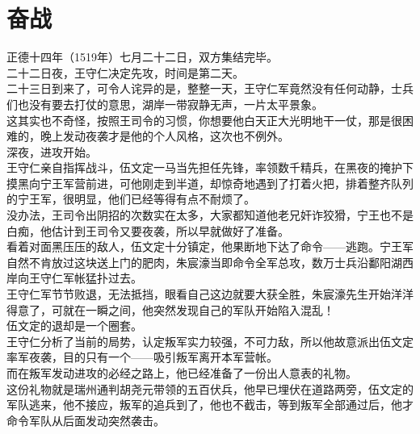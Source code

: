 \section{奋战}
\ifnum{}
	\begin{multicols}{\theparacolNo}
\fi
正德十四年（1519年）七月二十二日，双方集结完毕。\\

二十二日夜，王守仁决定先攻，时间是第二天。\\

二十三日到来了，可令人诧异的是，整整一天，王守仁军竟然没有任何动静，士兵们也没有要去打仗的意思，湖岸一带寂静无声，一片太平景象。\\

这其实也不奇怪，按照王司令的习惯，你想要他白天正大光明地干一仗，那是很困难的，晚上发动夜袭才是他的个人风格，这次也不例外。\\

深夜，进攻开始。\\

王守仁亲自指挥战斗，伍文定一马当先担任先锋，率领数千精兵，在黑夜的掩护下摸黑向宁王军营前进，可他刚走到半道，却惊奇地遇到了打着火把，排着整齐队列的宁王军，很明显，他们已经等得有点不耐烦了。\\

没办法，王司令出阴招的次数实在太多，大家都知道他老兄奸诈狡猾，宁王也不是白痴，他估计到王司令又要夜袭，所以早就做好了准备。\\

看着对面黑压压的敌人，伍文定十分镇定，他果断地下达了命令——逃跑。宁王军自然不肯放过这块送上门的肥肉，朱宸濠当即命令全军总攻，数万士兵沿鄱阳湖西岸向王守仁军帐猛扑过去。\\

王守仁军节节败退，无法抵挡，眼看自己这边就要大获全胜，朱宸濠先生开始洋洋得意了，可就在一瞬之间，他突然发现自己的军队开始陷入混乱！\\

伍文定的退却是一个圈套。\\

王守仁分析了当前的局势，认定叛军实力较强，不可力敌，所以他故意派出伍文定率军夜袭，目的只有一个——吸引叛军离开本军营帐。\\

而在叛军发动进攻的必经之路上，他已经准备了一份出人意表的礼物。\\

这份礼物就是瑞州通判胡尧元带领的五百伏兵，他早已埋伏在道路两旁，伍文定的军队逃来，他不接应，叛军的追兵到了，他也不截击，等到叛军全部通过后，他才命令军队从后面发动突然袭击。\\


\end{multicols}
